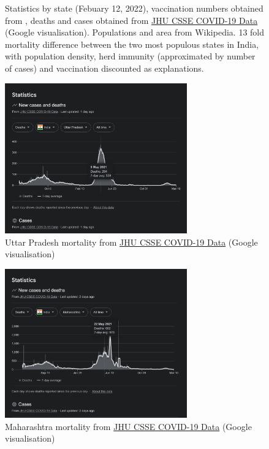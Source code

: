 \documentclass[11pt,a4paper,notitlepage]{report}
\begin{document}
\begin{figure}[h]
    \centering
    \caption{Statistics by state (Febuary 12, 2022), vaccination numbers obtained from \cite{statistaIndiaVaccination}, deaths and cases obtained from \href{https://github.com/CSSEGISandData/COVID-19}{JHU CSSE COVID-19 Data} (Google visualisation). Populations and area from Wikipedia. 13 fold mortality difference between the two most populous states in India, with population density, herd immunity (approximated by number of cases) and vaccination discounted as explanations.}
    \label{fig:india-stats}
\end{figure}

\begin{figure}[h]
    \centering
    \includegraphics[width=0.7\textwidth]{india-uttarpradesh-mortality}
    \caption{Uttar Pradesh mortality from \href{https://github.com/CSSEGISandData/COVID-19}{JHU CSSE COVID-19 Data} (Google visualisation)}
    \label{fig:india-uttarpradesh-mortality}
\end{figure}

\begin{figure}[h]
    \centering
    \includegraphics[width=0.7\textwidth]{india-maharashtra-mortality}
    \caption{Maharashtra mortality from \href{https://github.com/CSSEGISandData/COVID-19}{JHU CSSE COVID-19 Data} (Google visualisation)}
    \label{fig:india-maharashtra-mortality}
\end{figure}
\end{document}
